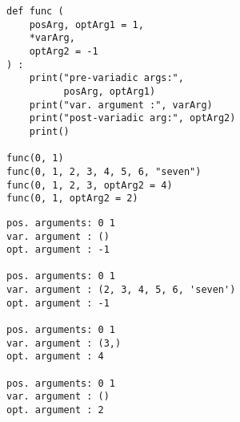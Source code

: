 
\begin{frame}[fragile]
%
\begin{tcbraster}[raster columns=2,
                  raster equal height,
                  nobeforeafter,
                  raster column skip=0.5cm]
\begin{codebox}
\begin{verbatim}
def func (
    posArg, optArg1 = 1,
    *varArg,
    optArg2 = -1
) :
    print("pre-variadic args:",
          posArg, optArg1)
    print("var. argument :", varArg)
    print("post-variadic arg:", optArg2)
    print()

func(0, 1)
func(0, 1, 2, 3, 4, 5, 6, "seven")
func(0, 1, 2, 3, optArg2 = 4)
func(0, 1, optArg2 = 2)
\end{verbatim}
\end{codebox}
%
\begin{cmdbox}
\begin{verbatim}
pos. arguments: 0 1
var. argument : ()
opt. argument : -1

pos. arguments: 0 1
var. argument : (2, 3, 4, 5, 6, 'seven')
opt. argument : -1

pos. arguments: 0 1
var. argument : (3,)
opt. argument : 4

pos. arguments: 0 1
var. argument : ()
opt. argument : 2
\end{verbatim}
\end{cmdbox}
\end{tcbraster}
%
\end{frame}


